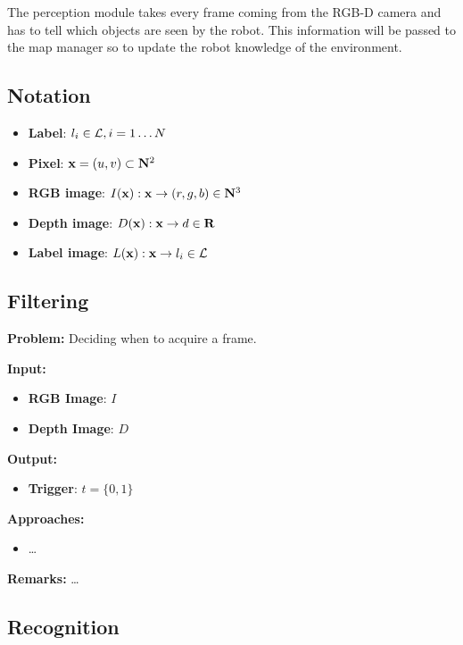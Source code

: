\documentclass{article}
\begin{document}
	The perception module takes every frame coming from the RGB-D camera and has to tell which objects are seen by the robot. This information will be passed to the map manager so to update the robot knowledge of the environment.
	
	\subsection{Notation}
	
	\begin{itemize}
		\item {\bf Label}: $l_i \in \mathcal{L} , i=1 \dots N$
		\item {\bf Pixel}: $\mathbf{x} = (u,v) \subset \mathbf{N}^2 $
		\item {\bf RGB image}: $I(\mathbf{x}) : \mathbf{x} \rightarrow (r,g,b) \in \mathbf{N}^3$
		\item {\bf Depth image}: $D(\mathbf{x}) : \mathbf{x} \rightarrow d \in \mathbf{R}$		
		\item {\bf Label image}: $L(\mathbf{x}) : \mathbf{x} \rightarrow l_i \in \mathcal{L}$		
	\end{itemize}
	
	\subsection{Filtering}
	
	{\bf Problem: } Deciding when to acquire a frame.

	\noindent
	{\bf Input: }
	\begin{itemize}
		\item {\bf RGB Image}: $I$
		\item {\bf Depth Image}: $D$
	\end{itemize}
	\noindent
	{\bf Output: }
	\begin{itemize}
		\item {\bf Trigger}: $t = \{0,1\}$
	\end{itemize}
	\noindent
	{\bf Approaches: }
	\begin{itemize}
		\item \dots
	\end{itemize}
	\noindent
	{\bf Remarks: } \dots
	
	\subsection{Recognition}
	 
\end{document}
